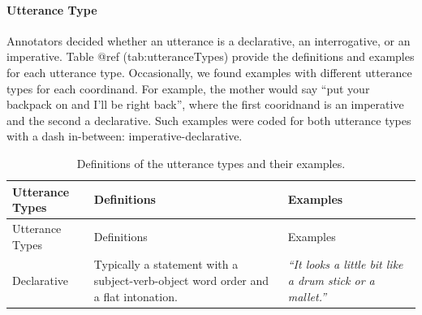 \documentclass[oneside]{report}
\theoremstyle{definition}
\theoremstyle{definition}
\theoremstyle{definition}
\theoremstyle{remark}
\begin{document}
\paragraph{Utterance Type}\label{utterance-type}

Annotators decided whether an utterance is a declarative, an
interrogative, or an imperative. Table @ref (tab:utteranceTypes) provide
the definitions and examples for each utterance type. Occasionally, we
found examples with different utterance types for each coordinand. For
example, the mother would say ``put your backpack on and I'll be right
back'', where the first cooridnand is an imperative and the second a
declarative. Such examples were coded for both utterance types with a
dash in-between: imperative-declarative.
\begin{longtable}[]{@{}lll@{}}
\caption{\label{tab:utteranceTypes} Definitions of the utterance types and
their examples.}\tabularnewline
\toprule
\begin{minipage}[b]{0.16\columnwidth}\raggedright\strut
Utterance Types\strut
\end{minipage} & \begin{minipage}[b]{0.38\columnwidth}\raggedright\strut
Definitions\strut
\end{minipage} & \begin{minipage}[b]{0.38\columnwidth}\raggedright\strut
Examples\strut
\end{minipage}\tabularnewline
\midrule
\endfirsthead
\toprule
\begin{minipage}[b]{0.16\columnwidth}\raggedright\strut
Utterance Types\strut
\end{minipage} & \begin{minipage}[b]{0.38\columnwidth}\raggedright\strut
Definitions\strut
\end{minipage} & \begin{minipage}[b]{0.38\columnwidth}\raggedright\strut
Examples\strut
\end{minipage}\tabularnewline
\midrule
\endhead
\begin{minipage}[t]{0.16\columnwidth}\raggedright\strut
Declarative\strut
\end{minipage} & \begin{minipage}[t]{0.38\columnwidth}\raggedright\strut
Typically a statement with a subject-verb-object word order and a flat
intonation.\strut
\end{minipage} & \begin{minipage}[t]{0.38\columnwidth}\raggedright\strut
\emph{``It looks a little bit like a drum stick or a mallet.''}\strut

\end{minipage}
\end{longtable}
\end{document}
